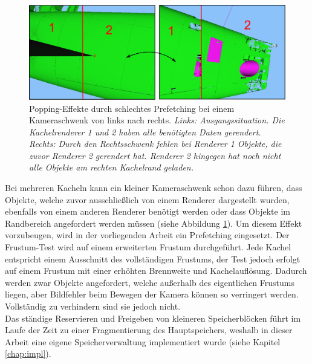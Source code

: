 \begin{figure}
\centering
\includegraphics[scale=0.40]{images/prefetching.pdf}
\caption{\label{fig:basics:prefetching}Popping-Effekte durch schlechtes Prefetching bei einem Kameraschwenk von links nach rechts. \textit{Links: Ausgangssituation. Die Kachelrenderer 1 und 2 haben alle benötigten Daten gerendert. Rechts: Durch den Rechtsschwenk fehlen bei Renderer 1 Objekte, die zuvor Renderer 2 gerendert hat. Renderer 2 hingegen hat noch nicht alle Objekte am rechten Kachelrand geladen.}}
\end{figure}
Bei mehreren Kacheln kann ein kleiner Kameraschwenk schon dazu führen, dass Objekte, welche zuvor ausschließlich von einem Renderer dargestellt wurden, ebenfalls von einem anderen Renderer benötigt werden oder dass Objekte im Randbereich angefordert werden müssen (siehe Abbildung \ref{fig:basics:prefetching}). Um diesem Effekt vorzubeugen, wird in der vorliegenden Arbeit ein Prefetching eingesetzt. Der Frustum-Test wird auf einem erweiterten Frustum durchgeführt. Jede Kachel entspricht einem Ausschnitt des vollständigen Frustums, der Test jedoch erfolgt auf einem Frustum mit einer erhöhten Brennweite und Kachelauflösung. Dadurch werden zwar Objekte angefordert, welche außerhalb des eigentlichen Frustums liegen, aber Bildfehler beim Bewegen der Kamera können so verringert werden. Vollständig zu verhindern sind sie jedoch nicht.\\
Das ständige Reservieren und Freigeben von kleineren Speicherblöcken führt im Laufe der Zeit zu einer Fragmentierung des Hauptspeichers, weshalb in dieser Arbeit eine eigene Speicherverwaltung implementiert wurde (siehe Kapitel \ref{chap:impl}). 


